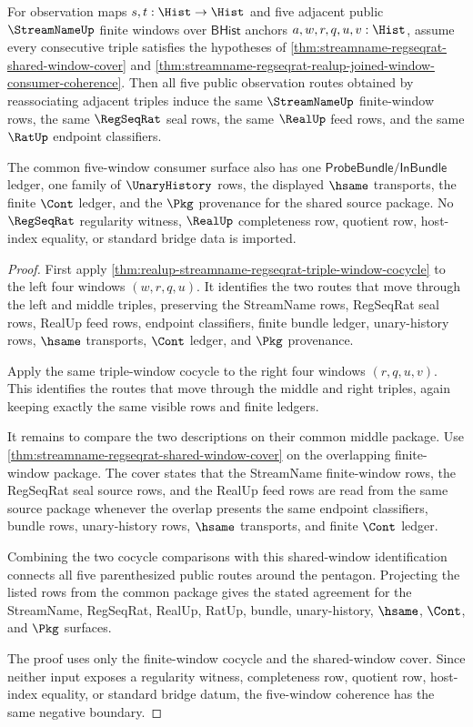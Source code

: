 \begin{theorem}
\label{thm:realup-streamname-regseqrat-five-window-pentagon-coherence}
For observation maps $s,t:\Hist\to\Hist$ and five adjacent public
$\StreamNameUp$ finite windows over $\mathsf{BHist}$ anchors
$a,w,r,q,u,v:\Hist$, assume every consecutive triple satisfies the hypotheses of
\autoref{thm:streamname-regseqrat-shared-window-cover} and
\autoref{thm:streamname-regseqrat-realup-joined-window-consumer-coherence}. Then
all five public observation routes obtained by reassociating adjacent triples
induce the same $\StreamNameUp$ finite-window rows, the same $\RegSeqRat$ seal
rows, the same $\RealUp$ feed rows, and the same $\RatUp$ endpoint classifiers.

The common five-window consumer surface also has one
$\mathsf{ProbeBundle}/\mathsf{InBundle}$ ledger, one family of $\UnaryHistory$
rows, the displayed $\hsame$ transports, the finite $\Cont$ ledger, and the
$\Pkg$ provenance for the shared source package. No $\RegSeqRat$ regularity
witness, $\RealUp$ completeness row, quotient row, host-index equality, or
standard bridge data is imported.
\end{theorem}
\begin{proof}
First apply
\autoref{thm:realup-streamname-regseqrat-triple-window-cocycle} to the left four
windows $(w,r,q,u)$. It identifies the two routes that move through the left and
middle triples, preserving the StreamName rows, RegSeqRat seal rows, RealUp feed
rows, endpoint classifiers, finite bundle ledger, unary-history rows, $\hsame$
transports, $\Cont$ ledger, and $\Pkg$ provenance.

Apply the same triple-window cocycle to the right four windows $(r,q,u,v)$. This
identifies the routes that move through the middle and right triples, again
keeping exactly the same visible rows and finite ledgers.

It remains to compare the two descriptions on their common middle package. Use
\autoref{thm:streamname-regseqrat-shared-window-cover} on the overlapping
finite-window package. The cover states that the StreamName finite-window rows,
the RegSeqRat seal source rows, and the RealUp feed rows are read from the same
source package whenever the overlap presents the same endpoint classifiers,
bundle rows, unary-history rows, $\hsame$ transports, and finite $\Cont$ ledger.

Combining the two cocycle comparisons with this shared-window identification
connects all five parenthesized public routes around the pentagon. Projecting
the listed rows from the common package gives the stated agreement for the
StreamName, RegSeqRat, RealUp, RatUp, bundle, unary-history, $\hsame$, $\Cont$,
and $\Pkg$ surfaces.

The proof uses only the finite-window cocycle and the shared-window cover. Since
neither input exposes a regularity witness, completeness row, quotient row,
host-index equality, or standard bridge datum, the five-window coherence has
the same negative boundary.
\end{proof}

